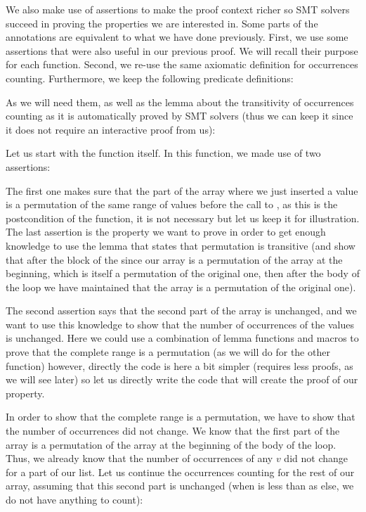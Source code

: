 We also make use of assertions to make the proof context richer so SMT solvers
succeed in proving the properties we are interested in. Some parts of the
annotations are equivalent to what we have done previously. First, we use some
assertions that were also useful in our previous proof. We will recall their
purpose for each function. Second, we re-use the same axiomatic definition for
occurrences counting. Furthermore, we keep the following predicate definitions:




As we will need them, as well as the lemma about the transitivity of
occurrences counting as it is automatically proved by SMT solvers (thus we can
keep it since it does not require an interactive proof from us):




Let us start with the  function itself. In this
function, we made use of two assertions:




The first one makes sure that the part of the array where we just inserted a
value is a permutation of the same range of values before the call to
, as this is the postcondition of the function, it is not
necessary but let us keep it for illustration. The last assertion is the
property we want to prove in order to get enough knowledge to use the lemma that
states that permutation is transitive (and show that after the block of the
since our array is a permutation of the array at the beginning, which is itself
a permutation of the original one, then after the body of the loop we have
maintained that the array is a permutation of the original one).



The second assertion says that the second part of the array is unchanged, and we
want to use this knowledge to show that the number of occurrences of the values
is unchanged. Here we could use a combination of lemma functions and macros to
prove that the complete range is a permutation (as we will do for the other
function) however, directly the code is here a bit simpler (requires less proofs,
as we will see later) so let us directly write the code that will create the
proof of our property.



In order to show that the complete range is a permutation, we have to show that
the number of occurrences did not change. We know that the first part of the array
is a permutation of the array at the beginning of the body of the loop. Thus, we
already know that the number of occurrences of any $v$ did not change for a part
of our list. Let us continue the occurrences counting for the rest of our array,
assuming that this second part is unchanged (when  is less than
 as else, we do not have anything to count):


